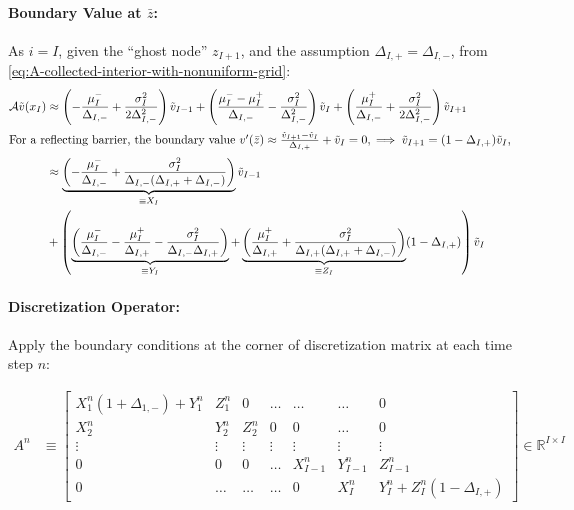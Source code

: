 \documentclass[11pt]{article}
\newcommand{\R}{\ensuremath{\mathbb{R}}}
\begin{document}
\paragraph{Boundary Value at $\bar{z}$:}
As $i=I$, given the ``ghost node'' $z_{I+1}$, and the assumption  $\Delta_{I,+} = \Delta_{I,-}$, from \cref{eq:A-collected-interior-with-nonuniform-grid}:
\begin{align}
\mathcal{A}  \tilde{v}(x_I)&\approx \left(-\frac{\mu_I^{-}}{\Delta_{I,-}} +\frac{\sigma_I^2}{2 \Delta_{I,-}^2}\right)\tilde{v}_{I-1} + \left(\frac{\mu_I^{-} - \mu_I^{+}}{\Delta_{I,-}}-\frac{\sigma_I^2}{\Delta_{I,-}^2}\right)\tilde{v}_I + \left(\frac{\mu_I^{+}}{\Delta_{I,-}} + \frac{\sigma_I^2}{2 \Delta_{I,-}^2}\right)\tilde{v}_{I+1}\\
\intertext{For a reflecting barrier, the boundary value $v'(\bar{z}) \approx \frac{\tilde{v}_{I+1}-\tilde{v}_I}{\Delta_{I,+}}+\tilde{v}_{I} = 0, \implies \tilde{v}_{I+1} = (1-\Delta_{I,+})\tilde{v}_I$,}
&\approx \underbrace{\left(-\frac{\mu_I^{-}}{\Delta_{I,-}} +\frac{\sigma_I^2}{\Delta_{I,-}(\Delta_{I,+}+\Delta_{I,-})}\right)}_{\equiv X_I} \tilde{v}_{I-1}\nonumber\\
&+ \left(\underbrace{\left(\frac{\mu_I^{-}}{\Delta_{I,-}} - \frac{\mu_I^{+}}{\Delta_{I,+}}-\frac{\sigma_I^2}{\Delta_{I,-}\Delta_{I,+}}\right)}_{\equiv Y_I} + \underbrace{\left(\frac{\mu_I^{+}}{\Delta_{I,+}} + \frac{\sigma_I^2}{\Delta_{I,+}(\Delta_{I,+}+\Delta_{I,-})}\right)}_{\equiv Z_I}(1-\Delta_{I,+}) \right) \tilde{v}_I \label{eq:reflecting-right-nonuniform}
\end{align}

\paragraph{Discretization Operator:} Apply the boundary conditions at the corner of discretization matrix at each time step $n$:

\begin{align}
		A^n &\equiv \begin{bmatrix}
	X_{1}^n(1+\Delta_{1,-})+Y_1^n & Z_1^n & 0 & \ldots & \ldots & \ldots & 0\\
	X^n_2 & Y^n_2 & Z^n_2 & 0 & 0 & \ldots & 0\\
	\vdots & \vdots & \vdots & \vdots & \vdots & \vdots & \vdots\\		
	0 & 0 & 0 & \ldots & X^n_{I-1} & Y^n_{I-1} & Z^n_{I-1}\\
	0 & \ldots & \ldots & \ldots & 0 & X_I^n & Y_I^n+Z_I^n(1-\Delta_{I,+})
\end{bmatrix}\in\R^{I\times I}\label{eq:A-n}
\end{align}
\end{document}
